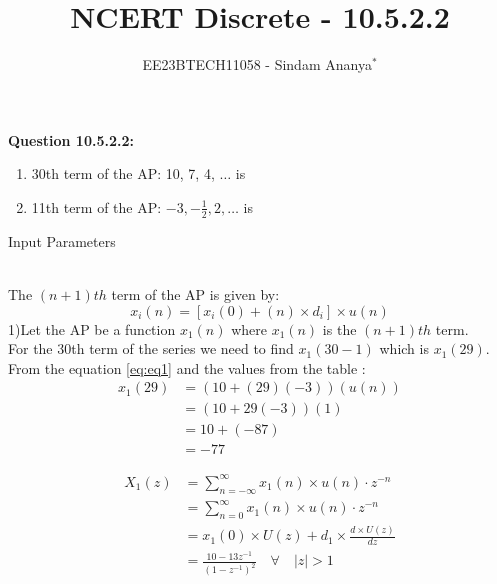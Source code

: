 \documentclass[journal,12pt,twocolumn]{IEEEtran}
\theoremstyle{remark}
\begin{document}

\vspace{3cm}

\title{NCERT Discrete - 10.5.2.2}
\author{EE23BTECH11058 - Sindam Ananya$^{*}$%
}
\maketitle
\newpage
\bigskip

\renewcommand{\thefigure}{\theenumi}
\renewcommand{\thetable}{\theenumi}

\vspace{3cm}
\textbf{Question 10.5.2.2:} 
\begin{enumerate}
\item 30th term of the AP: 10, 7, 4, $\ldots$ is 
\item 11th term of the AP: $-3, -\frac{1}{2}, 2, \ldots$ is
\end{enumerate}
\solution
\begin{table}[h!]
    \centering
    
    \caption{Input Parameters}
    \label{tab:table1}
    \end{table}\\
The $(n+1)th$ term of the AP is given by:
\begin{equation}
    x_i(n) = [x_i(0) + (n) \times d_i] \times u(n)
    \label{eq:eq1}
\end{equation}
1)Let the AP be a function $x_1(n)$ where $x_1(n)$ is the $(n+1)th$ term.\\
For the 30th term of the series we need to find $x_1(30-1)$ which is $x_1(29)$.\\
From the equation \eqref{eq:eq1} and the values from the table  :
\begin{align}
x_1(29) &= (10 + (29)(-3))(u(n))\\
&= (10 + 29(-3))(1)\\
&= 10+ (-87)  \\
&= -77
\end{align}
               
\begin{align}
X_1(z) &= \sum_{n=-\infty}^{\infty} x_1(n)\times u(n) \cdot z^{-n}\\
       &= \sum_{n=0}^{\infty} x_1(n)\times u(n) \cdot z^{-n}\\
       &= x_1(0)\times U(z) + d_1\times \frac{d\times U(z)}{dz}\\
       &= \frac{10 - 13z^{-1}}{(1-z^{-1})^2} \quad \forall \quad |z| > 1
\end{align}
\end{document}
